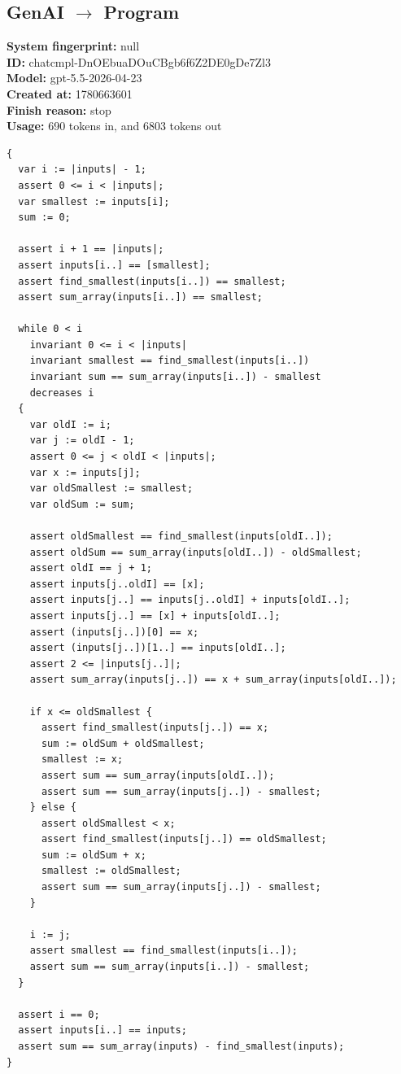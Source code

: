 \documentclass{article}
\begin{document}
\subsection*{GenAI $\rightarrow$ Program}
\textbf{System fingerprint: }null
\\\textbf{ID: }chatcmpl-DnOEbuaDOuCBgb6f6Z2DE0gDe7Zl3
\\\textbf{Model: }gpt-5.5-2026-04-23
\\\textbf{Created at: }1780663601
\\\textbf{Finish reason: }stop
\\\textbf{Usage: }690 tokens in, and 6803 tokens out
\begin{lstlisting}
{
  var i := |inputs| - 1;
  assert 0 <= i < |inputs|;
  var smallest := inputs[i];
  sum := 0;

  assert i + 1 == |inputs|;
  assert inputs[i..] == [smallest];
  assert find_smallest(inputs[i..]) == smallest;
  assert sum_array(inputs[i..]) == smallest;

  while 0 < i
    invariant 0 <= i < |inputs|
    invariant smallest == find_smallest(inputs[i..])
    invariant sum == sum_array(inputs[i..]) - smallest
    decreases i
  {
    var oldI := i;
    var j := oldI - 1;
    assert 0 <= j < oldI < |inputs|;
    var x := inputs[j];
    var oldSmallest := smallest;
    var oldSum := sum;

    assert oldSmallest == find_smallest(inputs[oldI..]);
    assert oldSum == sum_array(inputs[oldI..]) - oldSmallest;
    assert oldI == j + 1;
    assert inputs[j..oldI] == [x];
    assert inputs[j..] == inputs[j..oldI] + inputs[oldI..];
    assert inputs[j..] == [x] + inputs[oldI..];
    assert (inputs[j..])[0] == x;
    assert (inputs[j..])[1..] == inputs[oldI..];
    assert 2 <= |inputs[j..]|;
    assert sum_array(inputs[j..]) == x + sum_array(inputs[oldI..]);

    if x <= oldSmallest {
      assert find_smallest(inputs[j..]) == x;
      sum := oldSum + oldSmallest;
      smallest := x;
      assert sum == sum_array(inputs[oldI..]);
      assert sum == sum_array(inputs[j..]) - smallest;
    } else {
      assert oldSmallest < x;
      assert find_smallest(inputs[j..]) == oldSmallest;
      sum := oldSum + x;
      smallest := oldSmallest;
      assert sum == sum_array(inputs[j..]) - smallest;
    }

    i := j;
    assert smallest == find_smallest(inputs[i..]);
    assert sum == sum_array(inputs[i..]) - smallest;
  }

  assert i == 0;
  assert inputs[i..] == inputs;
  assert sum == sum_array(inputs) - find_smallest(inputs);
}
\end{lstlisting}
\end{document}
